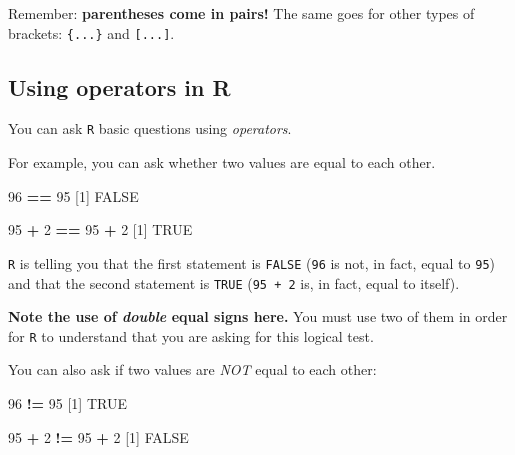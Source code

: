 \documentclass[
]{book}
\newenvironment{Shaded}{\begin{snugshade}}{\end{snugshade}}
\newcommand{\DecValTok}[1]{\textcolor[rgb]{0.00,0.00,0.81}{#1}}
\newcommand{\NormalTok}[1]{#1}
\newcommand{\OperatorTok}[1]{\textcolor[rgb]{0.81,0.36,0.00}{\textbf{#1}}}
\newcommand{\OtherTok}[1]{\textcolor[rgb]{0.56,0.35,0.01}{#1}}
\newcommand{\StringTok}[1]{\textcolor[rgb]{0.31,0.60,0.02}{#1}}
\begin{document}
Remember: \textbf{parentheses come in pairs!} The same goes for other types of brackets: \texttt{\{...\}} and \texttt{{[}...{]}}.

\hypertarget{using-operators-in-r}{%
\subsection*{Using operators in R}\label{using-operators-in-r}}

You can ask \texttt{R} basic questions using \emph{operators}.

For example, you can ask whether two values are equal to each other.

\begin{Shaded}
\begin{Highlighting}[]
\DecValTok{96} \OperatorTok{==}\StringTok{ }\DecValTok{95}
\NormalTok{[}\DecValTok{1}\NormalTok{] }\OtherTok{FALSE}
\end{Highlighting}
\end{Shaded}

\begin{Shaded}
\begin{Highlighting}[]
\DecValTok{95} \OperatorTok{+}\StringTok{ }\DecValTok{2} \OperatorTok{==}\StringTok{ }\DecValTok{95} \OperatorTok{+}\StringTok{ }\DecValTok{2}
\NormalTok{[}\DecValTok{1}\NormalTok{] }\OtherTok{TRUE}
\end{Highlighting}
\end{Shaded}

\texttt{R} is telling you that the first statement is \texttt{FALSE} (\texttt{96} is not, in fact, equal to \texttt{95}) and that the second statement is \texttt{TRUE} (\texttt{95\ +\ 2} is, in fact, equal to itself).

\textbf{Note the use of \emph{double} equal signs here.} You must use two of them in order for \texttt{R} to understand that you are asking for this logical test.

You can also ask if two values are \emph{NOT} equal to each other:

\begin{Shaded}
\begin{Highlighting}[]
\DecValTok{96} \OperatorTok{!=}\StringTok{ }\DecValTok{95}
\NormalTok{[}\DecValTok{1}\NormalTok{] }\OtherTok{TRUE}
\end{Highlighting}
\end{Shaded}

\begin{Shaded}
\begin{Highlighting}[]
\DecValTok{95} \OperatorTok{+}\StringTok{ }\DecValTok{2} \OperatorTok{!=}\StringTok{ }\DecValTok{95} \OperatorTok{+}\StringTok{ }\DecValTok{2}
\NormalTok{[}\DecValTok{1}\NormalTok{] }\OtherTok{FALSE}
\end{Highlighting}
\end{Shaded}
\end{document}
